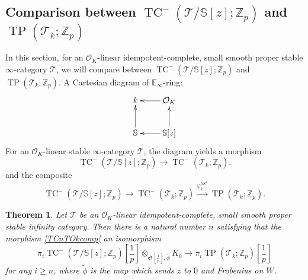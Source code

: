 \documentclass[11pt]{amsart}
\newcommand{\Z}{\mathbb{Z}}
\newcommand{\sO}{\mathcal{O}}
\newcommand{\sT}{\mathcal{T}}
\newcommand{\bS}{\mathbb{S}}
\newcommand{\TP}{\operatorname{TP}}
\newcommand{\TCn}{\operatorname{TC}^{-}}
\newcommand{\mS}{\mathfrak{S}}
\newtheorem{thm}[lemma]{Theorem}
\theoremstyle{definition}
\theoremstyle{remark}
\numberwithin{equation}{section}
\begin{document}
\subsection{Comparison between $\TCn(\sT/\bS[z];\Z_p)$ and $\TP(\sT_{k};\Z_p)$} In this section, for an $\sO_K$-linear idempotent-complete, small smooth proper stable $\infty$-category $\sT$, we will compare between $\TCn(\sT/\bS[z];\Z_p)$ and $\TP(\sT_{k};\Z_p)$. A Cartesian diagram of $\mathbb{E}_\infty$-ring:
\[
\xymatrix{
k & \sO_K \ar[l] \\
\bS \ar[u] & \bS[z] \ar[u] \ar[l]
}
\]
For an $\sO_K$-linear stable $\infty$-category $\sT$, the diagram yields a morphism 
\[
\TCn(\sT/\bS[z];\Z_p) \to \TCn(\sT_k;\Z_p).
\]
and the composite
\begin{equation}\label{TCnTOkcomp}
\TCn(\sT/\bS[z];\Z_p) \to \TCn(\sT_k;\Z_p) \overset{\varphi^{hS^1}_k}{\to} \TP(\sT_k;\Z_p).
\end{equation}
\begin{thm}\label{TCnTPcomp3}
Let $\sT$ be an $\sO_K$-linear idempotent-complete, small smooth proper stable infinity category. Then there is a natural number $n$ satisfying that the morphism \eqref{TCnTOkcomp} an isomorphism
\[
\pi_i \TCn(\sT/\bS[z];\Z_p)[\frac{1}{p}]\otimes_{\mS [\frac{1}{p}],\tilde{\phi}} K_0 \to \pi_i \TP(\sT_k;\Z_p)[\frac{1}{p}]
\]
for any $i \geq n$, where $\tilde{\phi}$ is the map which sends $z$ to $0$ and Frobenius on $W$.
\end{thm}
\end{document}
